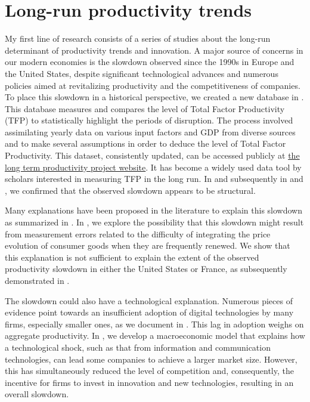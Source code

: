 \documentclass[12pt]{article}
\begin{document}
\section*{Long-run productivity trends}

My first line of research consists of a series of studies about the long-run determinant of productivity trends and innovation. A major source of concerns in our modern economies is the slowdown observed since the 1990s in Europe and the United States, despite significant technological advances and numerous policies aimed at revitalizing productivity and the competitiveness of companies. To place this slowdown in a historical perspective, we created a new database in \citet{bergeaud2016productivity}. This database
measures and compares the level of Total Factor Productivity (TFP) to statistically highlight the periods of disruption. The process involved assimilating yearly data on various input factors and GDP from diverse sources and to make several assumptions in order to deduce the level of Total Factor Productivity. This dataset, consistently updated, can be accessed publicly at \href{http://longtermproductivity.com}{the long term productivity project website}. It has become a widely used data tool by scholars interested in measuring TFP in the long run. In \citet*{bergeaud2016productivity} and subsequently in \citet*{bergeaud2017total} and \citet*{bergeaud2018role}, we confirmed that the observed slowdown appears to be structural.

Many explanations have been proposed in the literature to explain this slowdown as summarized in \citet{bergeaud2019market}. In \citet*{aghion2019missing}, we explore the possibility that this slowdown might result from measurement errors related to the difficulty of integrating the price evolution of consumer goods when they are frequently renewed. We show that this explanation is not sufficient to explain the extent of the observed productivity slowdown in either the United States or France, as subsequently demonstrated in \citet*{aghion2018firm}. 

The slowdown could also have a technological explanation. Numerous pieces of evidence point towards an insufficient adoption of digital technologies by many firms, especially smaller ones, as we document in \citet*{ecb}. This lag in adoption weighs on aggregate productivity. In \citet*{aghion2019theory}, we develop a macroeconomic model that explains how a technological shock, such as that from information and communication technologies, can lead some companies to achieve a larger market size. However, this has simultaneously reduced the level of competition and, consequently, the incentive for firms to invest in innovation and new technologies, resulting in an overall slowdown.
\end{document}

